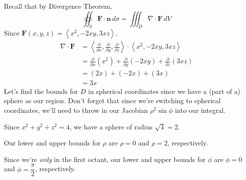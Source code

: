 \documentclass{article}
\newcommand{\lrp}[1]{\left( #1 \right)}
\newcommand{\lra}[1]{\left\langle #1 \right\rangle}
\newcommand{\F}[0]{\mathbf{F}}
\newcommand{\n}[0]{{\mathbf{n}}}
\begin{document}
Recall that by Divergence Theorem,
\begin{equation*}
    \oiint_S \F\cdot \n \,d\sigma = \iiint_D \nabla \cdot \F\,dV
\end{equation*}
Since $\F(x,y,z)=\lra{x^2,-2xy,3xz}$,
\begin{align*}
    \nabla \cdot \F&=\lra{\frac{\partial }{\partial x},\frac{\partial }{\partial y},\frac{\partial }{\partial z}}\cdot \lra{x^2,-2xy,3xz}\\
    &=\frac{\partial}{\partial x}\lrp{x^2}+\frac{\partial}{\partial y}\lrp{-2xy}+\frac{\partial}{\partial z}\lrp{3xz}\\
    &=\lrp{2x}+\lrp{-2x}+\lrp{3x}\\
    &=3x
\end{align*}
Let's find the bounds for $D$ in spherical coordinates since we have a (part of a) sphere as our region. Don't forget that since we're switching to spherical coordinates, we'll need to throw in our Jacobian $\rho^2\sin\phi$ into our integral. 

Since $x^2+y^2+z^2=4$, we have a sphere of radius $\sqrt{4}=2$.

Our lower and upper bounds for $\rho$ are $\rho=0$ and $\rho=2$, respectively.

Since we're \textit{only} in the first octant, our lower and upper bounds for $\phi$ are $\phi = 0$ and $\phi = \dfrac{\pi}{2}$, respectively.
\end{document}
